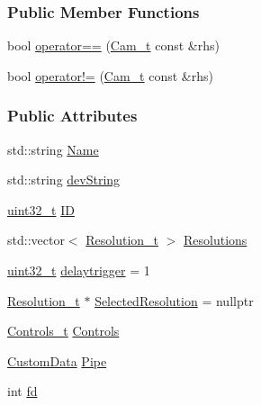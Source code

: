 \subsubsection*{Public Member Functions}
\begin{DoxyCompactItemize}
\item 
bool \hyperlink{struct_hardware_1_1_microscope_1_1_cam__t_a72212f71f8e4595ea2b535c04f70b35c}{operator==} (\hyperlink{struct_hardware_1_1_microscope_1_1_cam__t}{Cam\+\_\+t} const \&rhs)
\item 
bool \hyperlink{struct_hardware_1_1_microscope_1_1_cam__t_a55d11560610eb5319529d82e57bf8804}{operator!=} (\hyperlink{struct_hardware_1_1_microscope_1_1_cam__t}{Cam\+\_\+t} const \&rhs)
\end{DoxyCompactItemize}
\subsubsection*{Public Attributes}
\begin{DoxyCompactItemize}
\item 
std\+::string \hyperlink{struct_hardware_1_1_microscope_1_1_cam__t_abadd87f124923661f2e94d78cee3dbf4}{Name}
\item 
std\+::string \hyperlink{struct_hardware_1_1_microscope_1_1_cam__t_ab179002870eff0055f9f61b0bae276aa}{dev\+String}
\item 
\hyperlink{_soil_math_types_8h_a435d1572bf3f880d55459d9805097f62}{uint32\+\_\+t} \hyperlink{struct_hardware_1_1_microscope_1_1_cam__t_a870c5b29e3b987dce2a82308165cd178}{I\+D}
\item 
std\+::vector$<$ \hyperlink{struct_hardware_1_1_microscope_1_1_resolution__t}{Resolution\+\_\+t} $>$ \hyperlink{struct_hardware_1_1_microscope_1_1_cam__t_a28496beff27af86c6305e0dd950001e9}{Resolutions}
\item 
\hyperlink{_soil_math_types_8h_a435d1572bf3f880d55459d9805097f62}{uint32\+\_\+t} \hyperlink{struct_hardware_1_1_microscope_1_1_cam__t_a097619bda34a25968a4ecf7bd1097405}{delaytrigger} = 1
\item 
\hyperlink{struct_hardware_1_1_microscope_1_1_resolution__t}{Resolution\+\_\+t} $\ast$ \hyperlink{struct_hardware_1_1_microscope_1_1_cam__t_a85e4d902ee8a096450dbe544ec0ce773}{Selected\+Resolution} = nullptr
\item 
\hyperlink{class_hardware_1_1_microscope_a6e46a385288c3e0a8d9866fc8e147b09}{Controls\+\_\+t} \hyperlink{struct_hardware_1_1_microscope_1_1_cam__t_ab86ea92620f15288753a980b6f5d6c9f}{Controls}
\item 
\hyperlink{class_hardware_1_1_microscope_aba8ff1662f7d8a74e4aca943ccce7df4}{Custom\+Data} \hyperlink{struct_hardware_1_1_microscope_1_1_cam__t_a5cadb56c325736da812520b51c7fd65c}{Pipe}
\item 
int \hyperlink{struct_hardware_1_1_microscope_1_1_cam__t_ab8d692f05f97f5f3cc0401f750d9ad2e}{fd}
\end{DoxyCompactItemize}



